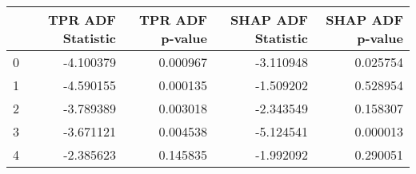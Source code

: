 \begin{tabular}{lrrrr}
\toprule
 & TPR ADF Statistic & TPR ADF p-value & SHAP ADF Statistic & SHAP ADF p-value \\
\midrule
0 & -4.100379 & 0.000967 & -3.110948 & 0.025754 \\
1 & -4.590155 & 0.000135 & -1.509202 & 0.528954 \\
2 & -3.789389 & 0.003018 & -2.343549 & 0.158307 \\
3 & -3.671121 & 0.004538 & -5.124541 & 0.000013 \\
4 & -2.385623 & 0.145835 & -1.992092 & 0.290051 \\
\bottomrule
\end{tabular}
